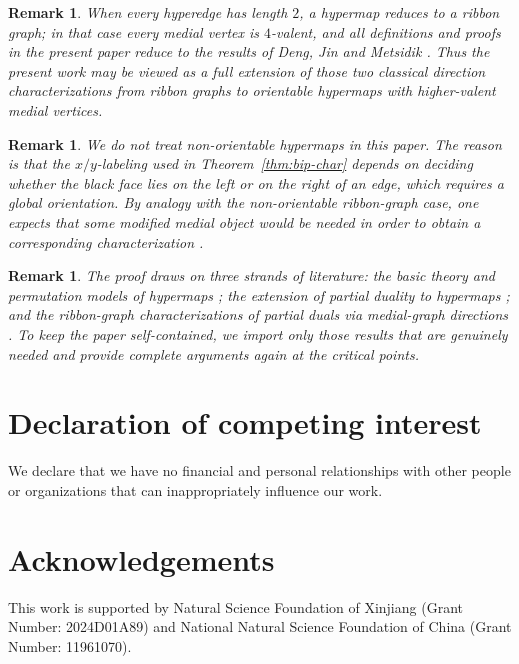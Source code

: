 \documentclass{article}
\newtheorem{remark}[theorem]{Remark}
\begin{document}
\begin{remark}\label{rem:ribbon}
When every hyperedge has length $2$, a hypermap reduces to a ribbon graph; in that case every medial vertex is $4$-valent, and all definitions and proofs in the present paper reduce to the results of Deng, Jin and Metsidik \cite{DengJinMetsidik2020}. Thus the present work may be viewed as a full extension of those two classical direction characterizations from ribbon graphs to orientable hypermaps with higher-valent medial vertices.
\end{remark}

\begin{remark}\label{rem:nonorientable}
We do not treat non-orientable hypermaps in this paper. The reason is that the $x/y$-labeling used in Theorem~\ref{thm:bip-char} depends on deciding whether the black face lies on the left or on the right of an edge, which requires a global orientation. By analogy with the non-orientable ribbon-graph case, one expects that some modified medial object would be needed in order to obtain a corresponding characterization \cite{DengJinMetsidik2020,EllisMonaghanMoffatt2013}.
\end{remark}

\begin{remark}\label{rem:literature}
The proof draws on three strands of literature: the basic theory and permutation models of hypermaps \cite{Walsh1975,JonesSingerman1978,Cori1975,GrossTucker1987,LandoZvonkin2004}; the extension of partial duality to hypermaps \cite{ChmutovVignes2022}; and the ribbon-graph characterizations of partial duals via medial-graph directions \cite{HuggettMoffatt2013,MetsidikJin2018,DengJinMetsidik2020}. To keep the paper self-contained, we import only those results that are genuinely needed and provide complete arguments again at the critical points.
\end{remark}

\section*{Declaration of competing interest}
We declare that we have no financial and personal relationships with other people or organizations that can inappropriately influence our work.

\section*{Acknowledgements}
This work is supported by Natural Science Foundation of Xinjiang (Grant Number: 2024D01A89) and National Natural Science Foundation of China (Grant Number: 11961070).
\end{document}
